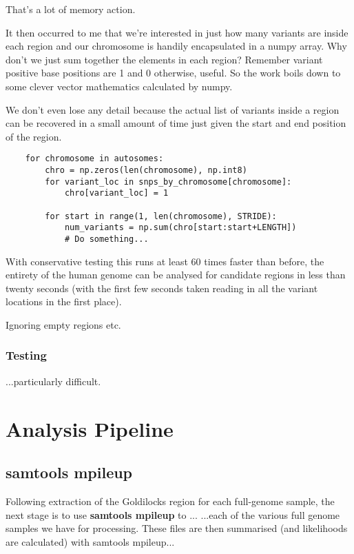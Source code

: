 That’s a lot of memory action.

It then occurred to me that we’re interested in just how many variants are
inside each region and our chromosome is handily encapsulated in a numpy array.
Why don’t we just sum together the elements in each region? Remember variant
positive base positions are 1 and 0 otherwise, useful. So the work boils down
to some clever vector mathematics calculated by numpy.

We don’t even lose any detail because the actual list of variants inside a
region can be recovered in a small amount of time just given the start and end
position of the region.

\begin{verbatim}
    for chromosome in autosomes:
        chro = np.zeros(len(chromosome), np.int8)
        for variant_loc in snps_by_chromosome[chromosome]:
            chro[variant_loc] = 1

        for start in range(1, len(chromosome), STRIDE):
            num_variants = np.sum(chro[start:start+LENGTH])
            # Do something...
\end{verbatim}

With conservative testing this runs at least 60 times faster than before, the
entirety of the human genome can be analysed for candidate regions in less than
twenty seconds (with the first few seconds taken reading in all the variant
locations in the first place).

Ignoring empty regions etc.


\subsubsection{Testing}
...particularly difficult.


\section{Analysis Pipeline}

\subsection{samtools mpileup}

Following extraction of the Goldilocks region for each full-genome sample, the
next stage is to use \textbf{samtools mpileup} to ...
...each of the various full genome samples we have for processing.  These files
are then summarised (and likelihoods are calculated) with samtools mpileup...

